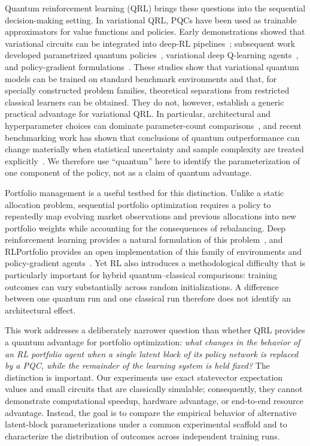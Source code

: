 \documentclass[aps,floatfix,superscriptaddress,twocolumn,tightenlines,amsmath,amssymb,nofootinbib,10pt,longbibliography,prl]{revtex4-2}
\begin{document}
Quantum reinforcement learning (QRL) brings these questions into the sequential
decision-making setting. In variational QRL, PQCs have been used as trainable approximators
for value functions and policies. Early demonstrations showed that variational circuits can
be integrated into deep-RL pipelines~\cite{Chen2020VariationalQuantumCi}; subsequent work
developed parametrized quantum policies~\cite{Jerbi2021ParametrizedQuantumP}, variational
deep Q-learning agents~\cite{Skolik2022QuantumagentsintheGy}, and policy-gradient
formulations~\cite{Sequeira2023Policygradientsusing}. These studies show that variational
quantum models can be trained on standard benchmark environments and that, for specially
constructed problem families, theoretical separations from restricted classical learners can
be obtained. They do not, however, establish a generic practical advantage for variational
QRL. In particular, architectural and hyperparameter choices can dominate parameter-count
comparisons~\cite{Skolik2022QuantumagentsintheGy}, and recent benchmarking work has shown
that conclusions of quantum outperformance can change materially when statistical uncertainty and sample complexity are treated explicitly~\cite{Meyer2025BenchmarkingQuantumR}. We therefore use ``quantum'' here to
identify the parameterization of one component of the policy, not as a claim of quantum
advantage.

Portfolio management is a useful testbed for this distinction. Unlike a static allocation
problem, sequential portfolio optimization requires a policy to repeatedly map evolving
market observations and previous allocations into new portfolio weights while accounting for
the consequences of rebalancing. Deep reinforcement learning provides a natural formulation
of this problem~\cite{jiang2017deepreinforcementlearningframework}, and RLPortfolio provides
an open implementation of this family of environments and policy-gradient
agents~\cite{RLportfolio}. Yet RL also introduces a methodological difficulty that is
particularly important for hybrid quantum--classical comparisons: training outcomes can vary
substantially across random initializations. A difference between one quantum run and one
classical run therefore does not identify an architectural effect.

This work addresses a deliberately narrower question than whether QRL provides a quantum
advantage for portfolio optimization: \emph{what changes in the behavior of an RL portfolio
agent when a single latent block of its policy network is replaced by a PQC, while the
remainder of the learning system is held fixed?} The distinction is important. Our
experiments use exact statevector expectation values and small circuits that are classically
simulable; consequently, they cannot demonstrate computational speedup, hardware advantage,
or end-to-end resource advantage. Instead, the goal is to compare the empirical behavior of
alternative latent-block parameterizations under a common experimental scaffold and to
characterize the distribution of outcomes across independent training runs.
\end{document}
